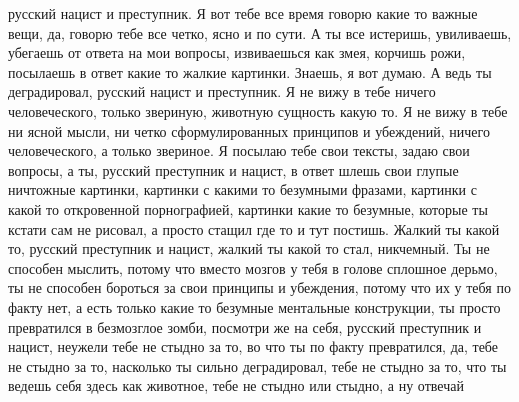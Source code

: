  
 
 
 
 

русский нацист и преступник. Я вот тебе все время говорю какие то важные вещи,
да, говорю тебе все четко, ясно и по сути. А ты все истеришь, увиливаешь,
убегаешь от ответа на мои вопросы, извиваешься как змея, корчишь рожи,
посылаешь в ответ какие то жалкие картинки. Знаешь, я вот думаю. А ведь ты
деградировал, русский нацист и преступник.  Я не вижу в тебе ничего
человеческого, только звериную, животную сущность какую то. Я не вижу в тебе ни
ясной мысли, ни четко сформулированных принципов и убеждений, ничего
человеческого, а только звериное.  Я посылаю тебе свои тексты, задаю свои
вопросы, а ты, русский преступник и нацист, в ответ шлешь свои глупые ничтожные
картинки, картинки с какими то безумными фразами, картинки с какой то
откровенной порнографией, картинки какие то безумные, которые ты кстати сам не
рисовал, а просто стащил где то и тут постишь. Жалкий ты какой то, русский
преступник и нацист, жалкий ты какой то стал, никчемный. Ты не способен
мыслить, потому что вместо мозгов у тебя в голове сплошное дерьмо, ты не
способен бороться за свои принципы и убеждения, потому что их у тебя по факту
нет, а есть только какие то безумные ментальные конструкции, ты просто
превратился в безмозглое зомби, посмотри же на себя, русский преступник и
нацист, неужели тебе не стыдно за то, во что ты по факту превратился, да, тебе
не стыдно за то, насколько ты сильно деградировал, тебе не стыдно за то, что ты
ведешь себя здесь как животное, тебе не стыдно или стыдно, а ну отвечай

